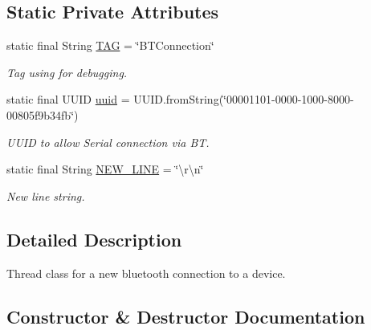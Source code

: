 \subsection*{Static Private Attributes}
\begin{DoxyCompactItemize}
\item 
\mbox{\label{class_android_app_1_1_b_t_connection_ad838024d59c68be866b5db329d6f6230}} 
static final String \hyperlink{class_android_app_1_1_b_t_connection_ad838024d59c68be866b5db329d6f6230}{T\+AG} = \char`\"{}B\+T\+Connection\char`\"{}
\begin{DoxyCompactList}\small\item\em Tag using for debugging. \end{DoxyCompactList}\item 
\mbox{\label{class_android_app_1_1_b_t_connection_a0e531d4cad0e5cca1e5b4446551b5c63}} 
static final U\+U\+ID \hyperlink{class_android_app_1_1_b_t_connection_a0e531d4cad0e5cca1e5b4446551b5c63}{uuid} = U\+U\+I\+D.\+from\+String(\char`\"{}00001101-\/0000-\/1000-\/8000-\/00805f9b34fb\char`\"{})
\begin{DoxyCompactList}\small\item\em U\+U\+ID to allow Serial connection via BT. \end{DoxyCompactList}\item 
\mbox{\label{class_android_app_1_1_b_t_connection_afe2f59edec0610e765222e02ab350e84}} 
static final String \hyperlink{class_android_app_1_1_b_t_connection_afe2f59edec0610e765222e02ab350e84}{N\+E\+W\+\_\+\+L\+I\+NE} = \char`\"{}\textbackslash{}r\textbackslash{}n\char`\"{}
\begin{DoxyCompactList}\small\item\em New line string. \end{DoxyCompactList}\end{DoxyCompactItemize}


\subsection{Detailed Description}
Thread class for a new bluetooth connection to a device. 

\subsection{Constructor \& Destructor Documentation}
\mbox{\label{class_android_app_1_1_b_t_connection_a9211856a493caa2423f07e36c2fd12b6}} 
